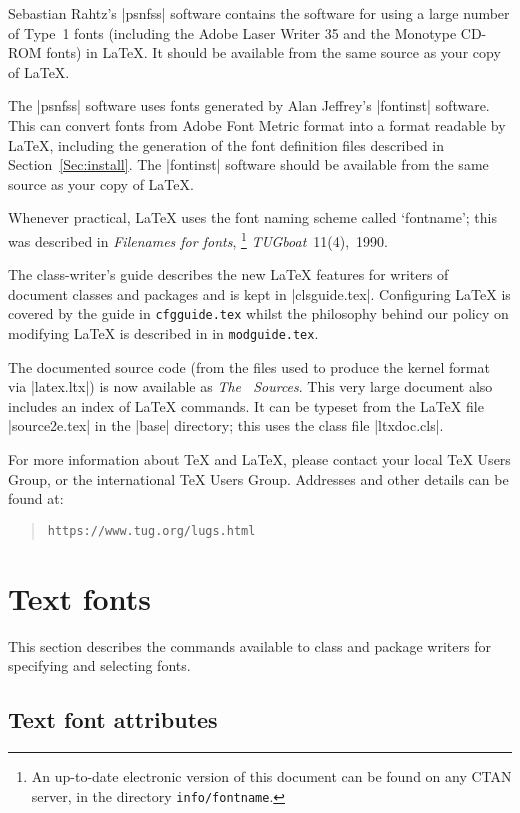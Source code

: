 \documentclass{ltxguide}[1995/11/28]
\begin{document}
Sebastian Rahtz's |psnfss| software contains the software for using a
large number of Type~1 fonts (including the Adobe Laser Writer 35 and
the Monotype CD-ROM fonts) in \LaTeX.  It should be available from the
same source as your copy of \LaTeX.

The |psnfss| software uses fonts generated by Alan Jeffrey's |fontinst|
software.  This can convert fonts from Adobe Font Metric format into a
format readable by \LaTeX, including the generation of the font
definition files described in Section~\ref{Sec:install}.  The |fontinst|
software should be available from the same source as your copy of
\LaTeX.

Whenever practical, \LaTeX{} uses the font naming scheme called
`fontname'; this was described in \emph{Filenames for fonts},%
\footnote{An up-to-date electronic version of this document can be found
  on any CTAN server, in the directory \texttt{info/fontname}.}
\emph{TUGboat}~11(4),~1990.

The class-writer's guide \emph{\clsguide} describes the new \LaTeX{}
features for writers of document classes and packages and is kept in
|clsguide.tex|. Configuring \LaTeX{} is covered by the guide
\emph{\cfgguide} in \texttt{cfgguide.tex} whilst the philosophy behind
our policy on modifying \LaTeX{} is described in \emph{\modguide} in
\texttt{modguide.tex}.

The documented source code (from the files used to produce the kernel
format via |latex.ltx|) is now available as \emph{The \LaTeXe\ Sources}.
This very large document also includes an index of \LaTeX{} commands.
It can be typeset from the \LaTeX{} file |source2e.tex| in the |base|
directory; this uses the class file |ltxdoc.cls|.

For more information about \TeX{} and \LaTeX{}, please contact your
local \TeX{} Users Group, or the international \TeX{} Users Group.
Addresses and other details can be found at:
\begin{quote}\small\label{addrs}
  \texttt{https://www.tug.org/lugs.html}
\end{quote}


\section{Text fonts}
\label{Sec:text}

This section describes the commands available to class and package
writers for specifying and selecting fonts.

\subsection{Text font attributes}
\label{sec:textfontattributes}
\end{document}
